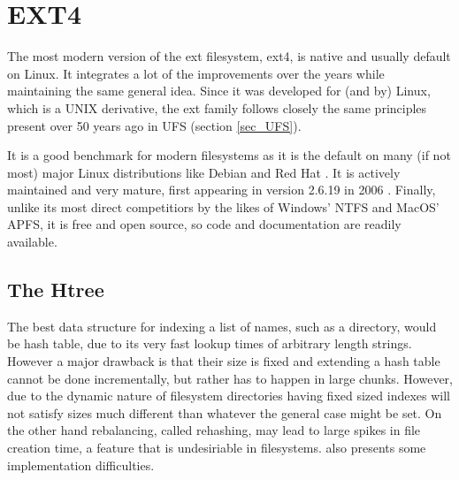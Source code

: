     \section{EXT4}
        \label{sec_ext4}

        The most modern version of the ext filesystem, ext4, is native and
        usually default on Linux. It integrates a lot of the improvements over
        the years while maintaining the same general idea. Since it was
        developed for (and by) Linux, which is a UNIX derivative, the ext
        family follows closely the same principles present over 50 years ago in
        UFS (section \ref{sec_UFS}).

        It is a good benchmark for modern filesystems as it is the default on
        many (if not most) major Linux distributions like Debian
        \cite{https://wiki.debian.org/FileSystem} and Red Hat
        \cite{https://access.redhat.com/documentation/en-us/red_hat_enterprise_linux/6/html/performance_tuning_guide/s-storage-fs}.
        It is actively maintained
        \cite{https://www.spinics.net/lists/linux-ext4/} and very mature, first
        appearing in version 2.6.19 in 2006
        \cite{http://www.h-online.com/open/features/Kernel-Log-Higher-and-Further-The-innovations-of-Linux-2-6-28-746805.html}.
        Finally, unlike its most direct competitiors by the likes of Windows'
        NTFS and MacOS' APFS, it is free and open source, so code and
        documentation are readily available.

        \subsection{The Htree}

            The best data structure for indexing a list of names, such as a
            directory, would be hash table, due to its very fast lookup times
            of arbitrary length strings. However a major drawback is that their
            size is fixed and extending a hash table cannot be done
            incrementally, but rather has to happen in large chunks. However,
            due to the dynamic nature of filesystem directories having fixed
            sized indexes will not satisfy sizes much different than whatever
            the general case might be set. On the other hand rebalancing,
            called rehashing, may lead to large spikes in file creation time, a
            feature that is undesiriable in filesystems. \citeauthor{Htree}
            also presents some implementation difficulties.

